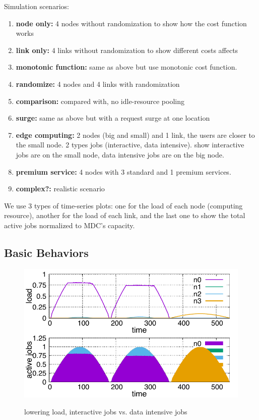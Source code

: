 Simulation scenarios:
\begin{enumerate}
  \item	{\bf node only:} 4 nodes without randomization to show how the
        cost function works
  \item	{\bf link only:} 4 links without randomization to show
        different costs affects
  \item	{\bf monotonic function:} same as above but use monotonic cost
        function.
  \item	{\bf randomize:} 4 nodes and 4 links with randomization
  \item {\bf comparison:} compared with, no idle-resource pooling
  \item	{\bf surge:} same as above but with a request surge at one location
  \item	{\bf edge computing:} 2 nodes (big and small) and 1 link, the
    users are closer to the small node. 2 types jobs (interactive,
    data intensive).  show interactive jobs are on the small node,
    data intensive jobs are on the big node.
  \item {\bf premium service:} 4 nodes with 3 standard and 1 premium services.
  \item	{\bf complex?:} realistic scenario
\end{enumerate}

We use 3 types of time-series plots: one for the load of each node
(computing resource), another for the load of each link, and the last
one to show the total active jobs normalized to MDC's capacity.

\subsection{Basic Behaviors}

\begin{figure}[tb]
  \begin{center}
    \includegraphics[width=1.0\columnwidth]{lowering.pdf}
    \vspace{-2.0ex}
    \caption{lowering load, interactive jobs vs. data intensive jobs}
    \label{fig:lowering}
  \end{center}
\end{figure}

